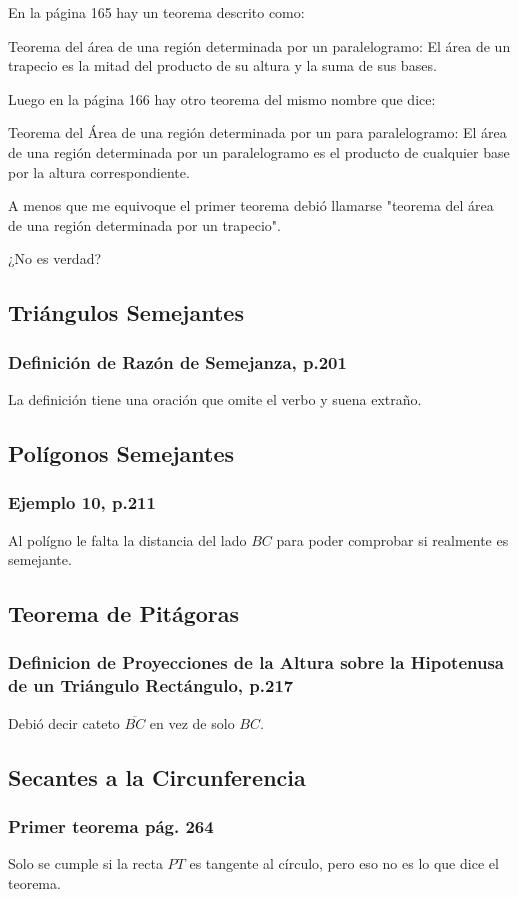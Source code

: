 En la página 165 hay un teorema descrito como:

Teorema del área de una región determinada por un paralelogramo:
El área de un trapecio es la mitad del producto de su altura y la suma de sus bases.

Luego en la página 166 hay otro teorema del mismo nombre que dice:

Teorema del Área de una región determinada por un para paralelogramo:
El área de una región determinada por un paralelogramo es el producto de cualquier base por la altura correspondiente.

A menos que me equivoque el primer teorema debió llamarse "teorema del área de una región determinada por un trapecio".

¿No es verdad?

\subsection{Triángulos Semejantes}
\subsubsection{Definición de Razón de Semejanza, p.201}

La definición tiene una oración que omite el verbo y suena extraño.


\subsection{Polígonos Semejantes}
\subsubsection{Ejemplo 10, p.211}

Al polígno le falta la distancia del lado \(BC\) para poder comprobar si realmente es semejante.

\subsection{Teorema de Pitágoras}
\subsubsection{Definicion de Proyecciones de la Altura sobre la Hipotenusa de un Triángulo Rectángulo, p.217}

Debió decir cateto \(\overline{BC}\) en vez de solo \(BC\).

\subsection{Secantes a la Circunferencia}
\subsubsection{Primer teorema pág. 264}

Solo se cumple si la recta $PT$ es tangente al círculo, pero eso no es lo que dice el teorema.

